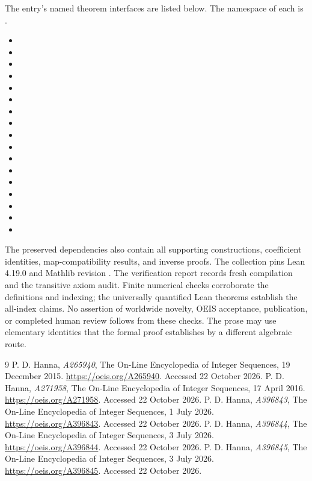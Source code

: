 \documentclass[11pt,a4paper]{article}
\theoremstyle{remark}\newtheorem{remark}[theorem]{Remark}
\begin{document}
The entry's named theorem interfaces are listed below. The namespace of
each is .
\begin{itemize}[leftmargin=1.5em,itemsep=1pt]
\item {}
\item {}
\item {}
\item {}
\item {}
\item {}
\item {}
\item {}
\item {}
\item {}
\item {}
\item {}
\item {}
\item {}
\item {}
\item {}
\item {}
\end{itemize}
The preserved dependencies also contain all supporting constructions,
coefficient identities, map-compatibility results, and inverse proofs.
The collection pins Lean 4.19.0 and Mathlib revision
.
The verification report records fresh compilation and the transitive axiom
audit. Finite numerical checks corroborate the definitions and indexing;
the universally quantified Lean theorems establish the all-index claims.
No assertion of worldwide novelty, OEIS acceptance, publication, or completed
human review follows from these checks. The prose may use elementary
identities that the formal proof establishes by a different algebraic route.
\begin{thebibliography}{9}
 P. D. Hanna, \emph{A265940}, The On-Line Encyclopedia of
Integer Sequences, 19 December 2015. \url{https://oeis.org/A265940}.
Accessed 22 October 2026.
 P. D. Hanna, \emph{A271958}, The On-Line Encyclopedia of
Integer Sequences, 17 April 2016. \url{https://oeis.org/A271958}.
Accessed 22 October 2026.
 P. D. Hanna, \emph{A396843}, The On-Line Encyclopedia of
Integer Sequences, 1 July 2026. \url{https://oeis.org/A396843}.
Accessed 22 October 2026.
 P. D. Hanna, \emph{A396844}, The On-Line Encyclopedia of
Integer Sequences, 3 July 2026. \url{https://oeis.org/A396844}.
Accessed 22 October 2026.
 P. D. Hanna, \emph{A396845}, The On-Line Encyclopedia of
Integer Sequences, 3 July 2026. \url{https://oeis.org/A396845}.
Accessed 22 October 2026.
\end{thebibliography}
\end{document}
